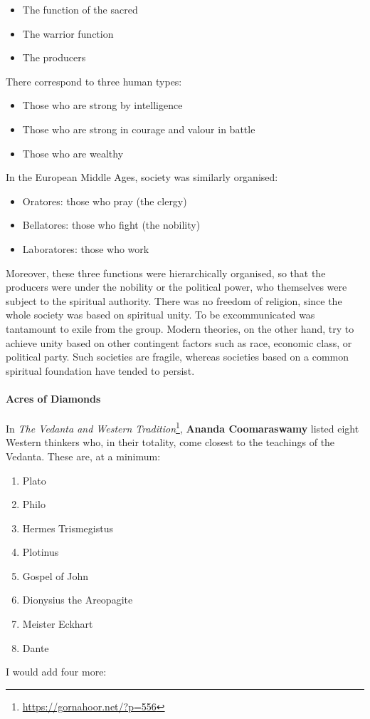 \begin{itemize}
\item The function of the sacred 
\item The warrior function 
\item The producers 
\end{itemize}
There correspond to three human types:

\begin{itemize}
\item Those who are strong by intelligence 
\item Those who are strong in courage and valour in battle 
\item Those who are wealthy 
\end{itemize}
In the European Middle Ages, society was similarly organised:

\begin{itemize}
\item Oratores: those who pray (the clergy) 
\item Bellatores: those who fight (the nobility) 
\item Laboratores: those who work 
\end{itemize}
Moreover, these three functions were hierarchically organised, so that the producers were under the nobility or the political power, who themselves were subject to the spiritual authority. There was no freedom of religion, since the whole society was based on spiritual unity. To be excommunicated was tantamount to exile from the group. Modern theories, on the other hand, try to achieve unity based on other contingent factors such as race, economic class, or political party. Such societies are fragile, whereas societies based on a common spiritual foundation have tended to persist.

\paragraph{Acres of Diamonds}
In \emph{The Vedanta and Western Tradition}\footnote{\url{https://gornahoor.net/?p=556}}, \textbf{Ananda Coomaraswamy} listed eight Western thinkers who, in their totality, come closest to the teachings of the Vedanta. These are, at a minimum:

\begin{enumerate}
\item Plato 
\item Philo 
\item Hermes Trismegistus 
\item Plotinus 
\item Gospel of John 
\item Dionysius the Areopagite 
\item Meister Eckhart 
\item Dante 
\end{enumerate}
I would add four more:

